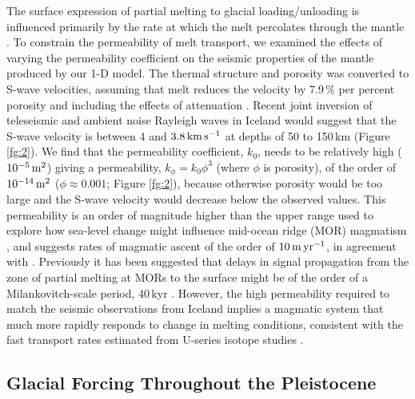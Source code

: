 \documentclass[draft,linenumbers]{agujournal2018}
\begin{document}
The surface expression of partial melting to glacial loading/unloading is influenced primarily by the rate at which the melt percolates through the mantle \citep{burley-2015}. To constrain the permeability of melt transport, we examined the effects of varying the permeability coefficient on the seismic properties of the mantle produced by our 1-D model. The thermal structure and porosity was converted to S-wave velocities, assuming that melt reduces the velocity by 7.9\,\% per percent porosity \citep{hammond-2000} and including the effects of attenuation \citep{goes-etal-2012}. Recent joint inversion of teleseismic and ambient noise Rayleigh waves in Iceland would suggest that the S-wave velocity is between 4 and $3.8\rm\,km\,s^{-1}$ at depths of 50 to 150\,km \citep{harmon-2016} (Figure \ref{fg:2}). We find that the permeability coefficient, $k_{0}$, needs to be relatively high ($10^{-5}\rm\,m^{2}$) giving a permeability, $k_{\phi} = k_{0}\phi^{3}$ (where $\phi$ is porosity), of the order of $10^{-14}\rm\,m^{2}$ ($\phi \approx 0.001$; Figure \ref{fg:2}), because otherwise porosity would be too large and the S-wave velocity would decrease below the observed values. This permeability is an order of magnitude higher than the upper range used to explore how sea-level change might influence mid-ocean ridge (MOR) magmatism \citep{crowley-etal-2015,burley-2015}, and suggests rates of magmatic ascent of the order of $10\rm\,m\,yr^{-1}$, in agreement with \cite{maclennan-etal-2002}. Previously it has been suggested that delays in signal propagation from the zone of partial melting at MORs to the surface might be of the order of a Milankovitch-scale period, 40\,kyr \citep{huybers-2017}. However, the high permeability required to match the seismic observations from Iceland implies a magmatic system that much more rapidly responds to change in melting conditions, consistent with the fast transport rates estimated from U-series isotope studies \citep{elliot-2014}.

\subsection{Glacial Forcing Throughout the Pleistocene}
\end{document}
